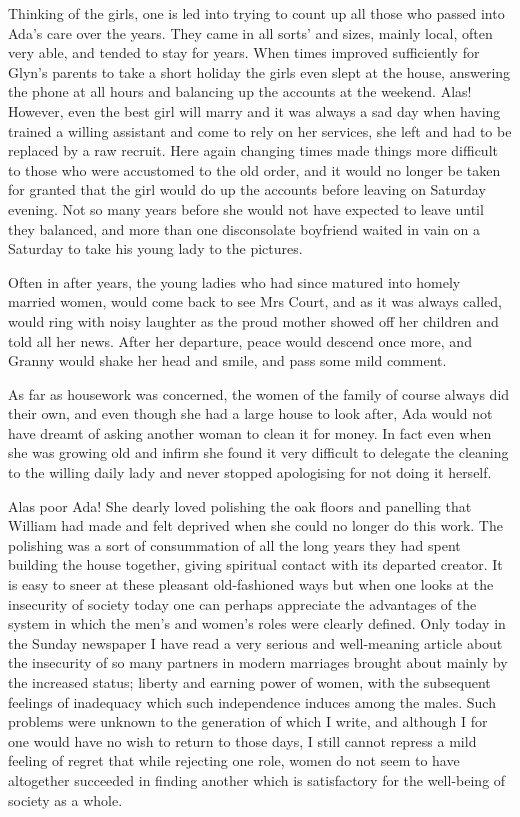 Thinking of the girls, one is led into trying to count up all those who passed into Ada’s care over the years. They came in all sorts' and sizes, mainly local, often very able, and tended to stay for years. When times improved sufficiently for Glyn's parents to take a short holiday the girls even slept at the house, answering the phone at all hours and balancing up the accounts at the weekend. Alas! However, even the best girl will marry and it was always a sad day when having trained a willing assistant and come to rely on her services, she left and had to be replaced by a raw recruit. Here again changing times made things more difficult to those who were accustomed to the old order, and it would no longer be taken for granted that the girl would do up the accounts before leaving on Saturday evening. Not so many years before she would not have expected to leave until they balanced, and more than one disconsolate boyfriend waited in vain on a Saturday to take his young lady to the pictures.

Often in after years, the young ladies who had since matured into homely married women, would come back to see Mrs Court, and  as it was always called, would ring with noisy laughter as the proud mother showed off her children and told all her news. After her departure, peace would descend once more, and Granny would shake her head and smile, and pass some mild comment. 

As far as housework was concerned, the women of the family of course always did their own, and even though she had a large house to look after, Ada would not have dreamt of asking another woman to clean it for money. In fact even when she was growing old and infirm she found it very difficult to delegate the cleaning to the willing daily lady and never stopped apologising for not doing it herself.

Alas poor Ada! She dearly loved polishing the oak floors and panelling that William had made and felt deprived when she could no longer do this work. The polishing was a sort of consummation of all the long years they had spent building the house together, giving spiritual contact with its departed creator. It is easy to sneer at these pleasant old-fashioned ways but when one looks at the insecurity of society today one can perhaps appreciate the advantages of the system in which the men's and women's roles were clearly defined. Only today in the Sunday newspaper I have read a very serious and well-meaning article about the insecurity of so many partners in modern marriages brought about mainly by the increased status; liberty and earning power of women, with the subsequent feelings of inadequacy which such independence induces among the males. Such problems were unknown to the generation of which I write, and although I for one would have no wish to return to those days, I still cannot repress a mild feeling of regret that while rejecting one role, women do not seem to have altogether succeeded in finding another which is satisfactory for the well-being of society as a whole.

